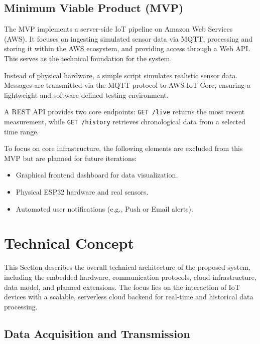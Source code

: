 \documentclass[conference,a4paper,flushend]{cs-techrep} %
\begin{document}
\subsection{Minimum Viable Product (MVP)}\label{sec:mvp}

The MVP implements a server-side IoT pipeline on Amazon Web Services (AWS). 
It focuses on ingesting simulated sensor data via MQTT, processing and storing it within the AWS ecosystem, 
and providing access through a Web API. This serves as the technical foundation for the system.

Instead of physical hardware, a simple script simulates realistic sensor data. 
Messages are transmitted via the MQTT protocol to AWS IoT Core, ensuring a lightweight and software-defined testing environment.

A REST API provides two core endpoints: \texttt{GET /live} returns the most recent measurement, while 
\texttt{GET /history} retrieves chronological data from a selected time range.

To focus on core infrastructure, the following elements are excluded from this MVP but are planned for future iterations:
\begin{itemize}
    \item Graphical frontend dashboard for data visualization.
    \item Physical ESP32 hardware and real sensors.
    \item Automated user notifications (e.g., Push or Email alerts).
\end{itemize}

\section{Technical Concept}\label{sec:technical_concept}

This Section describes the overall technical architecture of the proposed system, including the embedded hardware, communication protocols, cloud infrastructure, data model, and planned extensions. 
The focus lies on the interaction of IoT devices with a scalable, serverless cloud backend for real-time and historical data processing.

\subsection{Data Acquisition and Transmission}\label{sec:data_acquisition}
\end{document}
